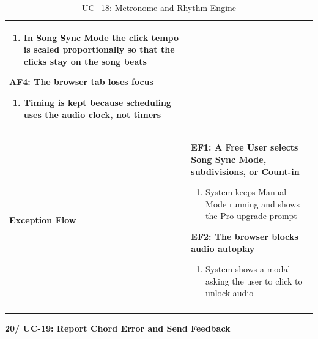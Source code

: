 \documentclass[a4paper]{article}
\newlength{\ucLeft}
\begin{document}
\begin{longtable}{|>{\bfseries}p{\ucLeft}|p{\dimexpr\linewidth-\ucLeft-2\tabcolsep-2\arrayrulewidth}|}
\begin{enumerate}[leftmargin=1.5em, nosep, topsep=2pt, partopsep=0pt, parsep=0pt, after=\strut]
    \item In Song Sync Mode the click tempo is scaled proportionally so that the clicks stay on the song beats
\end{enumerate}
\textbf{AF4: The browser tab loses focus}
\begin{enumerate}[leftmargin=1.5em, nosep, topsep=2pt, partopsep=0pt, parsep=0pt, after=\strut]
    \item Timing is kept because scheduling uses the audio clock, not timers
\end{enumerate}
\\ \hline
Exception Flow &
\textbf{EF1: A Free User selects Song Sync Mode, subdivisions, or Count-in}
\begin{enumerate}[leftmargin=1.5em, nosep, topsep=2pt, partopsep=0pt, parsep=0pt, after=\strut]
    \item System keeps Manual Mode running and shows the Pro upgrade prompt
\end{enumerate}
\textbf{EF2: The browser blocks audio autoplay}
\begin{enumerate}[leftmargin=1.5em, nosep, topsep=2pt, partopsep=0pt, parsep=0pt, after=\strut]
    \item System shows a modal asking the user to click to unlock audio
\end{enumerate}
\\ \hline
\caption{UC\_18: Metronome and Rhythm Engine}\label{tab:uc18_metronome}
\end{longtable}

\vspace{0.5em}
\noindent\textbf{20/ UC-19: Report Chord Error and Send Feedback}
\end{document}
